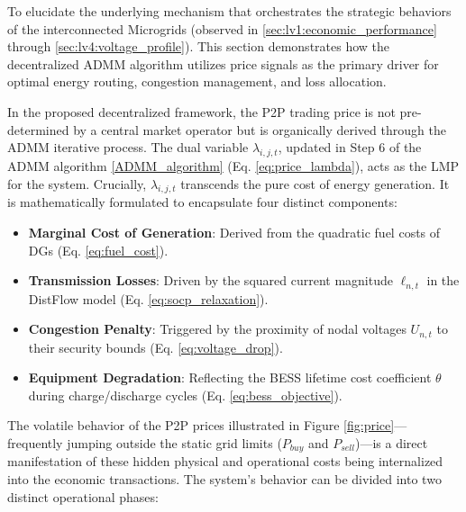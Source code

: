 \documentclass[preprint,12pt]{elsarticle}
\begin{document}
    To elucidate the underlying mechanism that orchestrates the strategic behaviors of the interconnected Microgrids (observed in \ref{sec:lv1:economic_performance} through \ref{sec:lv4:voltage_profile}). This section demonstrates how the decentralized ADMM algorithm utilizes price signals as the primary driver for optimal energy routing, congestion management, and loss allocation.

    In the proposed decentralized framework, the P2P trading price is not pre-determined by a central market operator but is organically derived through the ADMM iterative process. The dual variable $\lambda_{i,j,t}$, updated in Step 6 of the ADMM algorithm \ref{ADMM_algorithm} (Eq. \eqref{eq:price_lambda}), acts as the LMP for the system.
    Crucially, $\lambda_{i,j,t}$ transcends the pure cost of energy generation. It is mathematically formulated to encapsulate four distinct components:
    \begin{itemize}
        \item \textbf{Marginal Cost of Generation}: Derived from the quadratic fuel costs of DGs (Eq. \eqref{eq:fuel_cost}).
        \item \textbf{Transmission Losses}: Driven by the squared current magnitude $\ell_{n,t}$ in the DistFlow model (Eq. \eqref{eq:socp_relaxation}).
        \item \textbf{Congestion Penalty}: Triggered by the proximity of nodal voltages $U_{n,t}$ to their security bounds (Eq. \eqref{eq:voltage_drop}).
        \item \textbf{Equipment Degradation}: Reflecting the BESS lifetime cost coefficient $\theta$ during charge/discharge cycles (Eq. \eqref{eq:bess_objective}).
    \end{itemize}
    The volatile behavior of the P2P prices illustrated in Figure \ref{fig:price}—frequently jumping outside the static grid limits ($P_{buy}$ and $P_{sell}$)—is a direct manifestation of these hidden physical and operational costs being internalized into the economic transactions. The system's behavior can be divided into two distinct operational phases:
\end{document}
